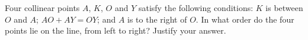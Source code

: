 Four collinear points $A$, $K$, $O$ and $Y$ satisfy the following conditions: $K$ is between $O$ and $A$; $AO+AY=OY$; and $A$ is to the right of $O$. In what order do the four points lie on the line, from left to right? Justify your answer.
